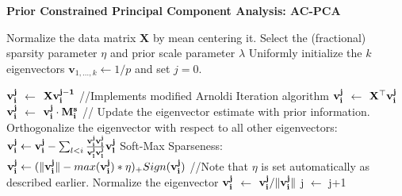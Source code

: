 \documentclass{llncs}
\newcommand{\bs}{\boldsymbol}
\begin{document}
\begin{algorithm}[htdp]
\small \caption{\bf Prior Constrained Principal Component Analysis: AC-PCA}
\label{algo1}
\begin{algorithmic}[1]
\STATE Normalize the data matrix {\bf X} by  mean centering it.
\STATE Select the (fractional) sparsity parameter $\eta$ and prior scale parameter $\lambda$
\STATE Uniformly initialize the $k$ eigenvectors $\bs v_{1,\ldots, k} \gets 1/p$ and set $j=0$.

\STATE ${\bf v_i^{j}}$ $\gets$ ${\bf Xv_i^{j-1}}$ //Implements modified Arnoldi Iteration algorithm
\STATE ${\bf v_i^{j}}$ $\gets$ ${\bf X^{\top}v_i^{j}}$
\STATE ${\bf v_i^{j}}$ $\gets$ ${\bf v_i^{j}}\cdot \bf M^s_i$ // Update the eigenvector estimate with prior information.
\STATE Orthogonalize the eigenvector with respect to all other eigenvectors:\\ ${\bf v_i^{j}} \gets {\bf v_i^{j}} - \sum_{l <i} \frac{\bf v_i^{j} \bf v_l^{j}}{\bf v_l^{j} \bf v_l^{j}}  \bf v_l^{j}$
\STATE Soft-Max Sparseness:  ${\bf v_i^{j}}  \leftarrow (\|{\bf v_i^{j}}\|  - max({\bf v_i^{j}})*\eta)_+ Sign({\bf v_i^{j}})$ //Note that $\eta$ is set automatically as described earlier.
\STATE Normalize the eigenvector ${\bf v_i^{j}}$ $\gets$ ${\bf v_i^{j}}/\|{\bf v_i^{j}}\|$
\ENDFOR
\STATE j $\leftarrow$ j+1
\ENDWHILE
\end{algorithmic}
\end{algorithm}
\end{document}
